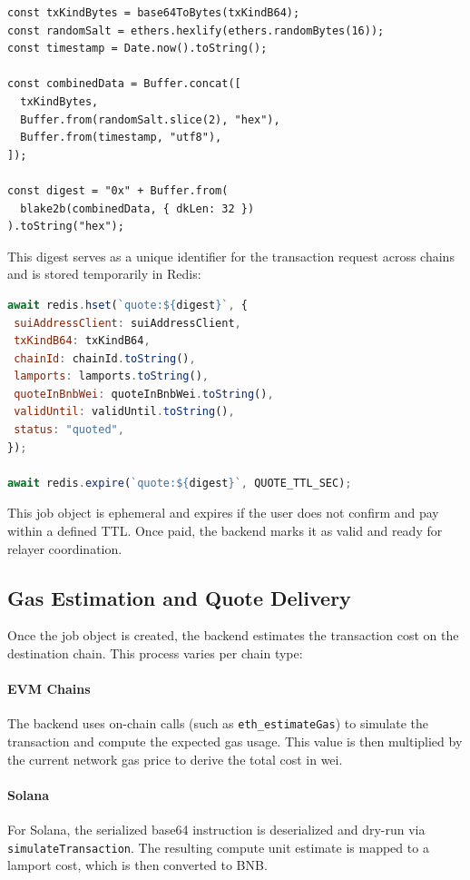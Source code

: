 \documentclass{article}
\begin{document}
\begin{lstlisting}[caption={Sui Job Digest Creation}]
const txKindBytes = base64ToBytes(txKindB64);
const randomSalt = ethers.hexlify(ethers.randomBytes(16));
const timestamp = Date.now().toString();

const combinedData = Buffer.concat([
  txKindBytes,
  Buffer.from(randomSalt.slice(2), "hex"),
  Buffer.from(timestamp, "utf8"),
]);

const digest = "0x" + Buffer.from(
  blake2b(combinedData, { dkLen: 32 })
).toString("hex");
\end{lstlisting}

This digest serves as a unique identifier for the transaction request across chains and is stored temporarily in Redis:

\begin{lstlisting}[language=JavaScript, caption={Caching Job Object in Redis}]
await redis.hset(`quote:${digest}`, {
 suiAddressClient: suiAddressClient,
 txKindB64: txKindB64,
 chainId: chainId.toString(),
 lamports: lamports.toString(),
 quoteInBnbWei: quoteInBnbWei.toString(),
 validUntil: validUntil.toString(),
 status: "quoted",
});

await redis.expire(`quote:${digest}`, QUOTE_TTL_SEC);
\end{lstlisting}

This job object is ephemeral and expires if the user does not confirm and pay within a defined TTL. Once paid, the backend marks it as valid and ready for relayer coordination.

\subsection{Gas Estimation and Quote Delivery}
Once the job object is created, the backend estimates the transaction cost on the destination chain. This process varies per chain type:


\paragraph{EVM Chains}
The backend uses on-chain calls (such as \texttt{eth\_estimateGas}) to simulate the transaction and compute the expected gas usage. This value is then multiplied by the current network gas price to derive the total cost in wei.

\paragraph{Solana}
For Solana, the serialized base64 instruction is deserialized and dry-run via \texttt{simulateTransaction}. The resulting compute unit estimate is mapped to a lamport cost, which is then converted to BNB.
\end{document}
